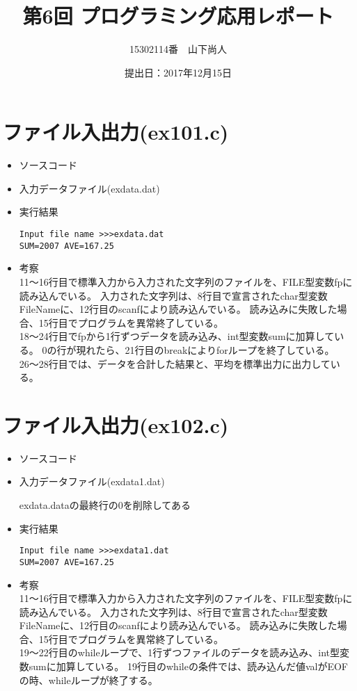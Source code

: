 \documentclass[a4paper]{jsarticle}
\title{第6回 プログラミング応用レポート}
\author{15302114番　山下尚人}
\date{提出日：2017年12月15日}
\begin{document}
\maketitle%

\section{ファイル入出力(ex101.c)}
	\begin{itemize}
	\item ソースコード
		 
		\mbox{}\newline
	\item 入力データファイル(exdata.dat)
		 
		\mbox{}\newline
	\item 実行結果
		\begin{lstlisting}
Input file name >>>exdata.dat
SUM=2007 AVE=167.25
		\end{lstlisting}
		\mbox{}\newline
	\item 考察\mbox{}\\
		 11〜16行目で標準入力から入力された文字列のファイルを、FILE型変数fpに読み込んでいる。
		入力された文字列は、8行目で宣言されたchar型変数FileNameに、12行目のscanfにより読み込んでいる。
		読み込みに失敗した場合、15行目でプログラムを異常終了している。\\
		 18〜24行目でfpから1行ずつデータを読み込み、int型変数sumに加算している。
		 0の行が現れたら、21行目のbreakによりforループを終了している。
		  26〜28行目では、データを合計した結果と、平均を標準出力に出力している。
	\end{itemize}
	\newpage	%

\section{ファイル入出力(ex102.c)}
	\begin{itemize}
	\item ソースコード
		 
		\mbox{}\newline
	\item 入力データファイル(exdata1.dat)
		 
		\mbox{}\newline
		exdata.dataの最終行の0を削除してある
	\item 実行結果
		\begin{lstlisting}
Input file name >>>exdata1.dat
SUM=2007 AVE=167.25
		\end{lstlisting}
		\mbox{}\newline
	\item 考察\mbox{}\\
		11〜16行目で標準入力から入力された文字列のファイルを、FILE型変数fpに読み込んでいる。
		入力された文字列は、8行目で宣言されたchar型変数FileNameに、12行目のscanfにより読み込んでいる。
		読み込みに失敗した場合、15行目でプログラムを異常終了している。\\
		19〜22行目のwhileループで、1行ずつファイルのデータを読み込み、int型変数sumに加算している。
		19行目のwhileの条件では、読み込んだ値valがEOFの時、whileループが終了する。
	\end{itemize}
	\newpage	%
\end{document}
